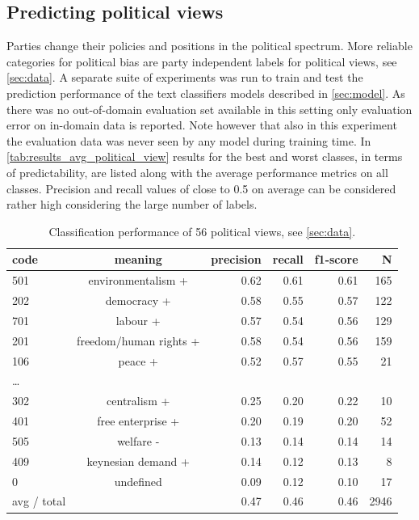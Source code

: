 \documentclass[runningheads,a4paper]{llncs}
\begin{document}
\subsection{Predicting political views}
Parties change their policies and positions in the political spectrum. More reliable categories for political bias are party independent labels for political views, see \autoref{sec:data}. A separate suite of experiments was run to train and test the prediction performance of the text classifiers models described in \autoref{sec:model}. As there was no out-of-domain evaluation set available in this setting only evaluation error on in-domain data is reported. Note however that also in this experiment the evaluation data was never seen by any model during training time.
In \autoref{tab:results_avg_political_view} results for the best and worst classes, in terms of predictability, are listed along with the average performance metrics on all classes. 
Precision and recall values of close to 0.5 on average can be considered rather high considering the large number of labels. \\

\begin{table}[t]
\caption{
\label{tab:results_avg_political_view}
Classification performance of 56 political views, see \autoref{sec:data}.
}
\begin{center}
\begin{tabular}{lcrrrr}
code & meaning  &      precision    &recall &  f1-score  & N\\
\hline\hline
%
       501  & environmentalism + &      0.62   &   0.61 &     0.61  &     165\\
        202 &   democracy + &   0.58  &    0.55   &   0.57   &    122\\
        701    & labour +&  0.57  &    0.54   &   0.56      & 129\\
                201    &freedom/human rights +  & 0.58   &   0.54   &   0.56   &    159\\
         106   & peace + & 0.52&      0.57   &   0.55    &    21\\
\dots\\
        302     &centralism + & 0.25     & 0.20  &    0.22  &      10\\
        401    &  free enterprise + &0.20    &  0.19    &  0.20   &     52\\
        505    &welfare - &  0.13   &   0.14   &   0.14   &     14\\
        409    & keynesian demand +&  0.14  &    0.12  &    0.13   &      8\\
            0    & undefined &  0.09  &    0.12   &   0.10    &    17\\
            \hline
avg / total  &  &  0.47    &  0.46 &     0.46 &     2946\\
%
\end{tabular}
\end{center}
\end{table}
\end{document}
